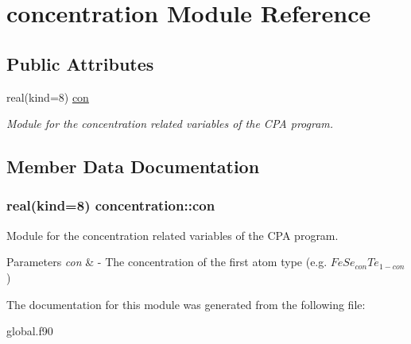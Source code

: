 \hypertarget{classconcentration}{\section{concentration Module Reference}
\label{classconcentration}
}
\subsection*{Public Attributes}
\begin{DoxyCompactItemize}
\item 
real(kind=8) \hyperlink{classconcentration_a890fb0a9ddacddeea4d8af5717f8b4a4}{con}
\begin{DoxyCompactList}\small\item\em Module for the concentration related variables of the C\-P\-A program. \end{DoxyCompactList}\end{DoxyCompactItemize}


\subsection{Member Data Documentation}
\hypertarget{classconcentration_a890fb0a9ddacddeea4d8af5717f8b4a4}{
\subsubsection[{con}]{\setlength{\rightskip}{0pt plus 5cm}real(kind=8) concentration\-::con}}\label{classconcentration_a890fb0a9ddacddeea4d8af5717f8b4a4}


Module for the concentration related variables of the C\-P\-A program. 


\begin{DoxyParams}{Parameters}
{\em con} & -\/ The concentration of the first atom type (e.\-g. $FeSe_{con}Te_{1-con}$) \\
\hline
\end{DoxyParams}


The documentation for this module was generated from the following file\-:\begin{DoxyCompactItemize}
\item 
global.\-f90\end{DoxyCompactItemize}
